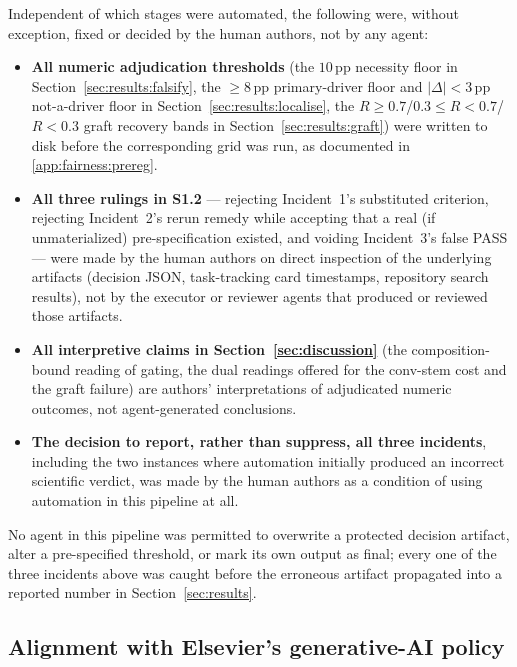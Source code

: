 \documentclass[11pt]{article}
\newcommand{\pp}{\,\mathrm{pp}}
\begin{document}
Independent of which stages were automated, the following were, without exception, fixed or decided by the human authors, not by any agent:
\begin{itemize}
\item \textbf{All numeric adjudication thresholds} (the $10\pp$ necessity floor in Section~\ref{sec:results:falsify}, the $\geq 8\pp$ primary-driver floor and $|\Delta|<3\pp$ not-a-driver floor in Section~\ref{sec:results:localise}, the $R \geq 0.7$/$0.3 \leq R < 0.7$/$R<0.3$ graft recovery bands in Section~\ref{sec:results:graft}) were written to disk before the corresponding grid was run, as documented in \ref{app:fairness:prereg}.
\item \textbf{All three rulings in S1.2} --- rejecting Incident~1's substituted criterion, rejecting Incident~2's rerun remedy while accepting that a real (if unmaterialized) pre-specification existed, and voiding Incident~3's false PASS --- were made by the human authors on direct inspection of the underlying artifacts (decision JSON, task-tracking card timestamps, repository search results), not by the executor or reviewer agents that produced or reviewed those artifacts.
\item \textbf{All interpretive claims in Section~\ref{sec:discussion}} (the composition-bound reading of gating, the dual readings offered for the conv-stem cost and the graft failure) are authors' interpretations of adjudicated numeric outcomes, not agent-generated conclusions.
\item \textbf{The decision to report, rather than suppress, all three incidents}, including the two instances where automation initially produced an incorrect scientific verdict, was made by the human authors as a condition of using automation in this pipeline at all.
\end{itemize}
No agent in this pipeline was permitted to overwrite a protected decision artifact, alter a pre-specified threshold, or mark its own output as final; every one of the three incidents above was caught before the erroneous artifact propagated into a reported number in Section~\ref{sec:results}.

\subsection{Alignment with Elsevier's generative-AI policy}
\end{document}
